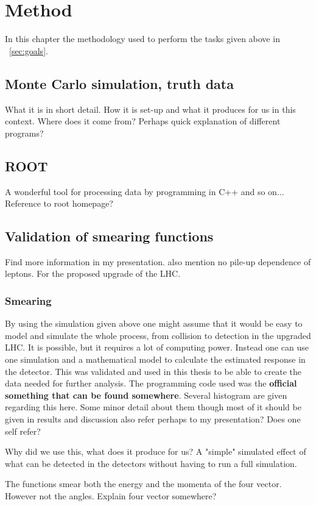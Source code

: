 \chapter{Method}\label{cha:meth}
In this chapter the methodology used to perform the tasks given above in ~\ref{sec:goals}.
\newpage
\section{Monte Carlo simulation, truth data}
What it is in short detail. How it is set-up and what it produces for us in this context. 
Where does it come from? Perhaps quick explanation of different programs?
\section{ROOT}
A wonderful tool for processing data by programming in C++ and so on... Reference to root homepage?
\section{Validation of smearing functions}
Find more information in my presentation. also mention no pile-up dependence of leptons.
For the proposed upgrade of the LHC.


\subsection{Smearing}
By using the simulation given above one might assume that it would be easy to model and simulate the whole process, from collision to detection in the upgraded LHC. It is possible, but it requires a lot of computing power. Instead one can use one simulation and a mathematical model to calculate the estimated response in the detector. This was validated and used in this thesis to be able to create the data needed for further analysis. The programming code used was the \textbf{official something that can be found somewhere}. 
Several histogram are given regarding this here. Some minor detail about them though most of it should be given in results and discussion also refer perhaps to my presentation? Does one self refer?


Why did we use this, what does it produce for us? A "simple" simulated effect of what can be detected in the detectors without having to run a full simulation. 

The functions smear both the energy and the momenta of the four vector. However not the angles. Explain four vector somewhere?

